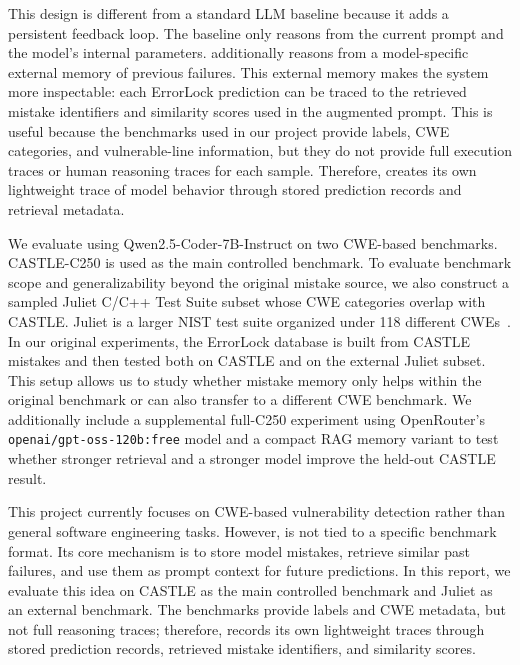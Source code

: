 This design is different from a standard LLM baseline because it adds a persistent feedback loop. The baseline only reasons from the current prompt and the model's internal parameters. \system additionally reasons from a model-specific external memory of previous failures. This external memory makes the system more inspectable: each ErrorLock prediction can be traced to the retrieved mistake identifiers and similarity scores used in the augmented prompt. This is useful because the benchmarks used in our project provide labels, CWE categories, and vulnerable-line information, but they do not provide full execution traces or human reasoning traces for each sample. Therefore, \system creates its own lightweight trace of model behavior through stored prediction records and retrieval metadata.

We evaluate \system using Qwen2.5-Coder-7B-Instruct on two CWE-based benchmarks. CASTLE-C250 is used as the main controlled benchmark. To evaluate benchmark scope and generalizability beyond the original mistake source, we also construct a sampled Juliet C/C++ Test Suite subset whose CWE categories overlap with CASTLE. Juliet is a larger NIST test suite organized under 118 different CWEs~\cite{juliet_nist}. In our original experiments, the ErrorLock database is built from CASTLE mistakes and then tested both on CASTLE and on the external Juliet subset. This setup allows us to study whether mistake memory only helps within the original benchmark or can also transfer to a different CWE benchmark. We additionally include a supplemental full-C250 experiment using OpenRouter's \texttt{openai/gpt-oss-120b:free} model and a compact RAG memory variant to test whether stronger retrieval and a stronger model improve the held-out CASTLE result.

This project currently focuses on CWE-based vulnerability detection rather than general software engineering tasks. However, \system is not tied to a specific benchmark format. Its core mechanism is to store model mistakes, retrieve similar past failures, and use them as prompt context for future predictions. In this report, we evaluate this idea on CASTLE as the main controlled benchmark and Juliet as an external benchmark. The benchmarks provide labels and CWE metadata, but not full reasoning traces; therefore, \system records its own lightweight traces through stored prediction records, retrieved mistake identifiers, and similarity scores.

